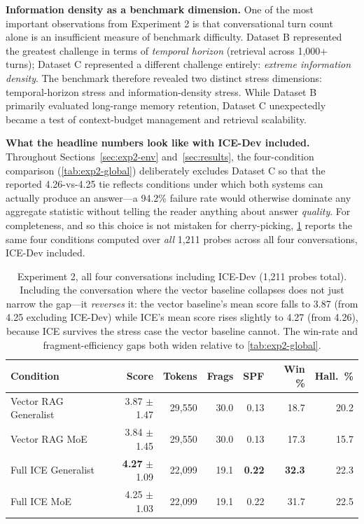 \documentclass[10pt]{article}
\begin{document}
\textbf{Information density as a benchmark dimension.} One of the most important observations from Experiment 2 is that conversational turn count alone is an insufficient measure of benchmark difficulty. Dataset B represented the greatest challenge in terms of \emph{temporal horizon} (retrieval across 1{,}000+ turns); Dataset C represented a different challenge entirely: \emph{extreme information density}. The benchmark therefore revealed two distinct stress dimensions: temporal-horizon stress and information-density stress. While Dataset B primarily evaluated long-range memory retention, Dataset C unexpectedly became a test of context-budget management and retrieval scalability.

\textbf{What the headline numbers look like with ICE-Dev included.} Throughout Sections~\ref{sec:exp2-env} and~\ref{sec:results}, the four-condition comparison (\cref{tab:exp2-global}) deliberately excludes Dataset C so that the reported 4.26-vs-4.25 tie reflects conditions under which both systems can actually produce an answer---a 94.2\% failure rate would otherwise dominate any aggregate statistic without telling the reader anything about answer \emph{quality}. For completeness, and so this choice is not mistaken for cherry-picking, \cref{tab:exp2-alldata} reports the same four conditions computed over \emph{all} 1{,}211 probes across all four conversations, ICE-Dev included.

\begin{table}[htbp]
\centering
\small
\caption{Experiment 2, all four conversations including ICE-Dev (1{,}211 probes total). Including the conversation where the vector baseline collapses does not just narrow the gap---it \emph{reverses} it: the vector baseline's mean score falls to 3.87 (from 4.25 excluding ICE-Dev) while ICE's mean score rises slightly to 4.27 (from 4.26), because ICE survives the stress case the vector baseline cannot. The win-rate and fragment-efficiency gaps both widen relative to \cref{tab:exp2-global}.}
\label{tab:exp2-alldata}
\begin{tabular}{@{}lrrrrrr@{}}
\toprule
\textbf{Condition} & \textbf{Score} & \textbf{Tokens} & \textbf{Frags} & \textbf{SPF} & \textbf{Win \%} & \textbf{Hall.\ \%} \\
\midrule
Vector RAG Generalist & 3.87 $\pm$ 1.47 & 29{,}550 & 30.0 & 0.13 & 18.7 & 20.2 \\
Vector RAG MoE        & 3.84 $\pm$ 1.45 & 29{,}550 & 30.0 & 0.13 & 17.3 & 15.7 \\
Full ICE Generalist   & \textbf{4.27} $\pm$ 1.09 & 22{,}099 & 19.1 & \textbf{0.22} & \textbf{32.3} & 22.3 \\
Full ICE MoE          & 4.25 $\pm$ 1.03 & 22{,}099 & 19.1 & 0.22 & 31.7 & 22.5 \\
\bottomrule
\end{tabular}
\end{table}
\end{document}
